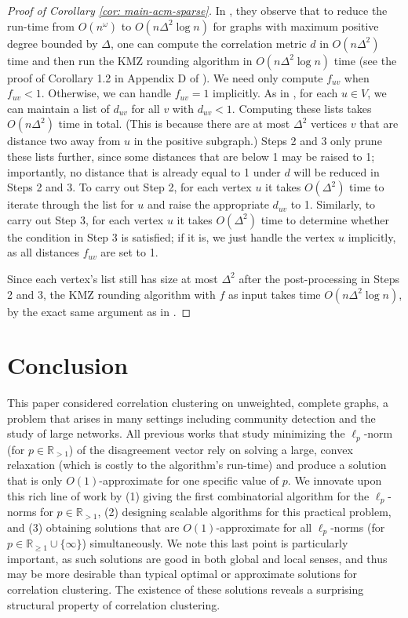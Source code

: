 \documentclass[11pt]{article}
\begin{document}
\begin{proof}[Proof of Corollary \ref{cor: main-acm-sparse}]
    In \cite{DMN23}, they observe that to reduce the run-time from $O(n^\omega)$ to $O(n\Delta^2 \log n)$ for graphs with maximum positive degree bounded by $\Delta$, one can compute the correlation metric $d$ in $O(n\Delta^2)$ time and then run the KMZ rounding algorithm in $O(n\Delta^2 \log n)$ time (see the proof of Corollary 1.2 in Appendix D of \cite{DMN23}). We need only compute $f_{uv}$ when $f_{uv}<1$. Otherwise, we can handle $f_{uv} = 1$ implicitly. As in \cite{DMN23}, for each $u \in V$, we can maintain a list of  $d_{uv}$ for all $v$ with $d_{uv} < 1$. Computing these lists takes $O(n\Delta^2)$ time in total. (This is because there are at most $\Delta^2$ vertices $v$ that are distance two away from $u$ in the positive subgraph.) Steps 2 and 3 only prune these lists further, since some distances that are below 1 may be raised to 1; importantly, no distance that is already equal to 1 under $d$ will be reduced in Steps 2 and 3. To carry out Step 2, for each vertex $u$ it takes $O(\Delta^2)$ time to iterate through the list for $u$ and raise the appropriate $d_{uv}$ to 1. Similarly, to carry out Step 3, for each vertex $u$ it takes $O(\Delta^2)$ time to determine whether the condition in Step 3 is satisfied; if it is, we just handle the vertex $u$ implicitly, as all distances $f_{uv}$ are set to 1. 

    Since each vertex's list still has size at most $\Delta^2$ after the post-processing in Steps 2 and 3, the KMZ rounding algorithm with $f$ as input takes time $O(n\Delta^2 \log n)$, by the exact same argument as in \cite{DMN23}.  
\end{proof}










\section{Conclusion}

This paper considered correlation clustering on unweighted, complete graphs, 
a problem that arises in many settings including community detection and the study of large networks.
All previous works that study minimizing the $\ell_p$-norm (for $p \in \mathbb{R}_{>1}$) of the disagreement vector rely on solving a large, convex relaxation (which is costly to the algorithm's run-time) and produce a solution that is only $O(1)$-approximate for one specific value of $p$. 
We innovate upon this rich line of work by 
(1) giving the first combinatorial algorithm for the $\ell_p$-norms for $p \in \mathbb{R}_{>1}$, 
(2) designing scalable algorithms for this practical problem, and 
(3) obtaining solutions that are $O(1)$-approximate for all $\ell_p$-norms (for $p \in \mathbb{R}_{\geq1} \cup \{\infty\}$) simultaneously.  
We note this last point is particularly important, 
as such solutions are good in both global and local senses, 
and thus may be more desirable than typical optimal or approximate solutions for correlation clustering. The existence of these solutions reveals a surprising structural property of correlation clustering.
\end{document}
